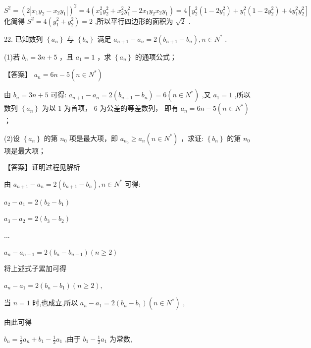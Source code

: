 \documentclass[10pt]{article}
\begin{document}
\({S}^{2} = {\left( 2\left| {x}_{1}{y}_{2} - {x}_{2}{y}_{1}\right| \right) }^{2} = 4\left( {{x}_{1}^{2}{y}_{2}^{2} + {x}_{2}^{2}{y}_{1}^{2} - 2{x}_{1}{y}_{2}{x}_{2}{y}_{1}}\right)  = 4\left\lbrack  {{y}_{2}^{2}\left( {1 - 2{y}_{1}^{2}}\right)  + {y}_{1}^{2}\left( {1 - 2{y}_{2}^{2}}\right)  + 4{y}_{1}^{2}{y}_{2}^{2}}\right\rbrack\) 化简得 \({S}^{2} = 4\left( {{y}_{1}^{2} + {y}_{2}^{2}}\right)  = 2\) ,所以平行四边形的面积为 \(\sqrt{2}\) .

22. 已知数列 \(\left\{  {a}_{n}\right\}\) 与 \(\left\{  {b}_{n}\right\}\) 满足 \({a}_{n + 1} - {a}_{n} = 2\left( {{b}_{n + 1} - {b}_{n}}\right) ,n \in  {N}^{ * }\) .

(1)若 \({b}_{n} = {3n} + 5\) ，且 \({a}_{1} = 1\) ，求 \(\left\{  {a}_{n}\right\}\) 的通项公式；

【答案】 \({a}_{n} = {6n} - 5\left( {n \in  {N}^{ * }}\right)\)

由 \({b}_{n} = {3n} + 5\) 可得: \({a}_{n + 1} - {a}_{n} = 2\left( {{b}_{n + 1} - {b}_{n}}\right)  = 6\left( {n \in  {N}^{ * }}\right)\) ,又 \({a}_{1} = 1\) ,所以数列 \(\left\{  {a}_{n}\right\}\) 为以 1 为首项， 6 为公差的等差数列， 即有 \({a}_{n} = {6n} - 5\left( {n \in  {N}^{ * }}\right)\) ；

(2)设 \(\left\{  {a}_{n}\right\}\) 的第 \({n}_{0}\) 项是最大项，即 \({a}_{{n}_{0}} \geq  {a}_{n}\left( {n \in  {N}^{ * }}\right)\) ，求证: \(\left\{  {b}_{n}\right\}\) 的第 \({n}_{0}\) 项是最大项；

【答案】证明过程见解析

由 \({a}_{n + 1} - {a}_{n} = 2\left( {{b}_{n + 1} - {b}_{n}}\right) ,n \in  {N}^{ * }\) 可得:

\({a}_{2} - {a}_{1} = 2\left( {{b}_{2} - {b}_{1}}\right)\)

\({a}_{3} - {a}_{2} = 2\left( {{b}_{3} - {b}_{2}}\right)\)

...

\({a}_{n} - {a}_{n - 1} = 2\left( {{b}_{n} - {b}_{n - 1}}\right) \left( {n \geq  2}\right)\)

将上述式子累加可得

\({a}_{n} - {a}_{1} = 2\left( {{b}_{n} - {b}_{1}}\right) \left( {n \geq  2}\right) ,\)

当 \(n = 1\) 时,也成立,所以 \({a}_{n} - {a}_{1} = 2\left( {{b}_{n} - {b}_{1}}\right) \left( {n \in  {N}^{ * }}\right)\) ,

由此可得

\({b}_{n} = \frac{1}{2}{a}_{n} + {b}_{1} - \frac{1}{2}{a}_{1}\) ,由于 \({b}_{1} - \frac{1}{2}{a}_{1}\) 为常数,
\end{document}
